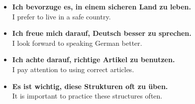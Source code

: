 \documentclass[a4paper,11pt]{article}
\newcommand{\ExampleItem}[2]{\item \textbf{#1}\\{\small\color{SoftGray}#2}}
\begin{document}
        \begin{exbox}
            \begin{itemize}
                \ExampleItem{Ich bevorzuge es, in einem sicheren Land zu leben.}{I prefer to live in a safe country.}
                \ExampleItem{Ich freue mich darauf, Deutsch besser zu sprechen.}{I look forward to speaking German better.}
                \ExampleItem{Ich achte darauf, richtige Artikel zu benutzen.}{I pay attention to using correct articles.}
                \ExampleItem{Es ist wichtig, diese Strukturen oft zu üben.}{It is important to practice these structures often.}
            \end{itemize}
        \end{exbox}
\end{document}
